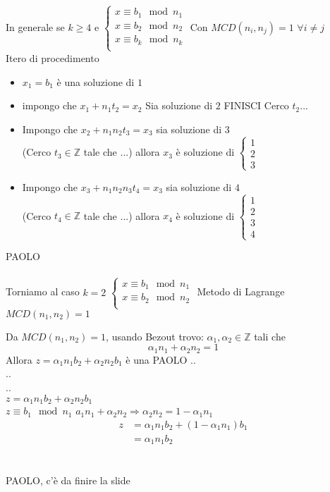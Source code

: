     In generale se $k\geq 4$ e
    $
    \begin{cases}
        x\equiv b_1\mod n_1\\
        x\equiv b_2\mod n_2\\
        x\equiv b_k\mod n_k\\
    \end{cases}
    $ Con $MCD(n_i,n_j)=1$ $\forall i\neq j $\\
    Itero di procedimento 
    \begin{itemize}
        \item $x_1=b_1 $ è una soluzione di $1$
        \item impongo che $x_1+n_1t_2=x_2$ Sia soluzione di $2$
            FINISCI Cerco $t_2$...
        \item Impongo che  $x_2+n_1n_2t_3=x_3$ sia soluzione di $3$\\
            (Cerco $t_3\in\mathbb{Z}$ tale che ...) allora $x_3$ è soluzione di 
            $\begin{cases}
                1\\2\\3
            \end{cases}$
        \item Impongo che  $x_3+n_1n_2n_3t_4=x_3$ sia soluzione di $4$\\
            (Cerco $t_4\in\mathbb{Z}$ tale che ...) allora $x_4$ è soluzione di 
            $\begin{cases}
                1\\2\\3\\4
            \end{cases}$
    \end{itemize}
    {\color{purple} PAOLO}\\\\

    Torniamo al caso $k=2$
$    \begin{cases}
        x\equiv b_1\mod n_1\\
        x\equiv b_2\mod n_2\\
    \end{cases}$
    Metodo di Lagrange $MCD(n_1,n_2)=1$

    Da $MCD(n_1,n_2)=1$, usando Bezout trovo:
    $\alpha_1, \alpha_2\in\mathbb{Z}$ tali che 
    $$\alpha_1n_1+\alpha_2n_2=1$$
    Allora $z=\alpha_1n_1b_2+\alpha_2n_2b_1$ è una {\color{purple}PAOLO}
    ..\\
    ..\\
    ..\\    
    $z=\alpha_1n_1b_2+\alpha_2n_2b_1$\\
    $z\equiv b_1\mod n_1$
    $a_1n_1+\alpha_2n_2\Longrightarrow \alpha_2n_2=1-\alpha_1n_1$
    \begin{align} 
        z&=\alpha_1n_1b_2+(1-\alpha_1n_1)b_1\\
         &=\alpha_1n_1b_2
    \end{align} 
    {\color{purple} \\\\PAOLO, c'è da finire la slide\\\\}
    

